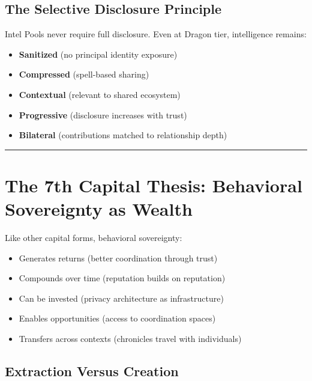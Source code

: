 \documentclass[
  11pt,
]{article}
\begin{document}
\subsection{The Selective Disclosure
Principle}\label{the-selective-disclosure-principle}

Intel Pools never require full disclosure. Even at Dragon tier,
intelligence remains:

\begin{itemize}
\item
  \textbf{Sanitized} (no principal identity exposure)
\item
  \textbf{Compressed} (spell-based sharing)
\item
  \textbf{Contextual} (relevant to shared ecosystem)
\item
  \textbf{Progressive} (disclosure increases with trust)
\item
  \textbf{Bilateral} (contributions matched to relationship depth)
\end{itemize}

\begin{center}\rule{0.5\linewidth}{0.5pt}\end{center}

\section{The 7th Capital Thesis: Behavioral Sovereignty as
Wealth}\label{the-7th-capital-thesis-behavioral-sovereignty-as-wealth}

Like other capital forms, behavioral sovereignty:

\begin{itemize}
\item
  Generates returns (better coordination through trust)
\item
  Compounds over time (reputation builds on reputation)
\item
  Can be invested (privacy architecture as infrastructure)
\item
  Enables opportunities (access to coordination spaces)
\item
  Transfers across contexts (chronicles travel with individuals)
\end{itemize}

\subsection{Extraction Versus
Creation}\label{extraction-versus-creation}
\end{document}
